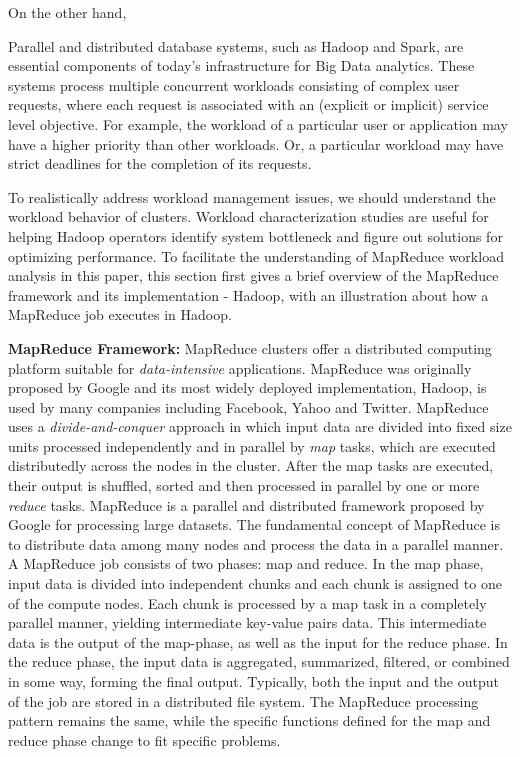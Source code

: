 \documentclass[conference]{IEEEtran}
\begin{document}
On the other hand, 

Parallel and distributed database systems, such as Hadoop and Spark, are essential components of today’s infrastructure for Big Data analytics. 
These systems process multiple concurrent workloads consisting of complex user requests, where each request is associated with an (explicit or implicit) service level objective. For example, the workload of a particular user or application may have a higher priority than other workloads. Or, a particular workload may have strict deadlines for the completion of its requests.

To realistically address workload management issues, we should understand the workload behavior of clusters.
Workload characterization studies are useful for helping Hadoop operators identify system bottleneck and figure out solutions for optimizing performance.
To facilitate the understanding of MapReduce workload analysis in this paper, this section first gives a brief overview of the MapReduce framework and its implementation - Hadoop, with an illustration about how a MapReduce job executes in Hadoop.


\noindent
\textbf{MapReduce Framework:}
MapReduce clusters offer a distributed computing platform suitable for \textit{data-intensive} applications. 
MapReduce was originally proposed by Google and its most widely deployed implementation, Hadoop, is used by many companies including Facebook, Yahoo and Twitter.
MapReduce uses a \textit{divide-and-conquer} approach in which input data are divided into fixed size units processed independently and in parallel by \textit{map} tasks, which are executed distributedly across the nodes in the cluster. After the map tasks are executed, their output is shuffled, sorted and then processed in parallel by one or more \textit{reduce} tasks.
MapReduce is a parallel and distributed framework proposed by Google for processing large datasets. 
The fundamental concept of MapReduce is to distribute data among many nodes and process the data in a parallel manner. 
A MapReduce job consists of two phases: map and reduce. 
In the map phase, input data is divided into independent chunks and each chunk is assigned to one of the compute nodes. 
Each chunk is processed by a map task in a completely parallel manner, yielding intermediate key-value pairs data. 
This intermediate data is the output of the map-phase, as well as the input for the reduce phase. In the reduce phase, the input data is aggregated, summarized, filtered, or combined in some way, forming the final output. 
Typically, both the input and the output of the job are stored in a distributed file system. 
The MapReduce processing pattern remains the same, while the specific functions defined for the map and reduce phase change to fit specific problems.
\end{document}
